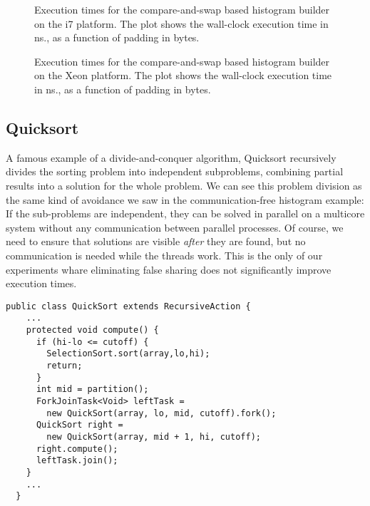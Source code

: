 \begin{figure}[hbpt]
\graphicspath{{plots/}}

\caption{Execution times for the compare-and-swap based histogram builder on the i7 platform. The plot shows the
	wall-clock execution time in ns., as a function of padding in bytes.}
	\label{fig:histo-cas-i7}
\end{figure}

\begin{figure}[hbpt]
\graphicspath{{plots/}}

\caption{Execution times for the compare-and-swap based histogram builder on the Xeon platform. The plot shows the
	wall-clock execution time in ns., as a function of padding in bytes.}
	\label{fig:histo-cas-xeon}
\end{figure}

\subsection{Quicksort}
A famous example of a divide-and-conquer algorithm, Quicksort recursively
divides the sorting problem into independent subproblems, combining partial
results into a solution for the whole problem. We can see this problem division
as the same kind of avoidance we saw in the communication-free histogram
example: If the sub-problems are independent, they can be solved in parallel on
a multicore system without any communication between parallel processes. Of
course, we need to ensure that solutions are visible \textit{after} they are
found, but no communication is needed while the threads work. This is the only
of our experiments whare eliminating false sharing does not significantly
improve execution times.

\begin{code}
\begin{Verbatim}[frame=single]
  public class QuickSort extends RecursiveAction {
    ...
    protected void compute() {
      if (hi-lo <= cutoff) {
        SelectionSort.sort(array,lo,hi);
        return;
      }
      int mid = partition();
      ForkJoinTask<Void> leftTask =
        new QuickSort(array, lo, mid, cutoff).fork();
      QuickSort right =
        new QuickSort(array, mid + 1, hi, cutoff);
      right.compute();
      leftTask.join();
    }
    ...
  }
\end{Verbatim}
	\caption{Simplified code for the Quicksort problem. The left-out
	 method implements sequential Selection sort.
	The left-out  method implements a median-of-three
	version of Hoare partitioning.}
	\label{code:qsort}
\end{code}

